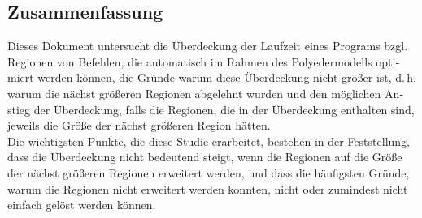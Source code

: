\vfill

\begin{otherlanguage}{ngerman}
    \chapter*{Zusammenfassung}
    Dieses Dokument untersucht die Überdeckung der Laufzeit eines Programs bzgl. Regionen von Befehlen, die automatisch im Rahmen des Polyedermodells optimiert werden können, die Gründe warum diese Überdeckung nicht größer ist, d.\,h. warum die nächst größeren Regionen abgelehnt wurden und den möglichen Anstieg der Überdeckung, falls die Regionen, die in der Überdeckung enthalten sind, jeweils die Größe der nächst größeren Region hätten.\\
    Die wichtigsten Punkte, die diese Studie erarbeitet, bestehen in der Feststellung, dass die Überdeckung nicht bedeutend steigt, wenn die Regionen auf die Größe der nächst größeren Regionen erweitert werden, und dass die häufigsten Gründe, warum die Regionen nicht erweitert werden konnten, nicht oder zumindest nicht einfach gelöst werden können.
\end{otherlanguage}

\endgroup

\vfill
